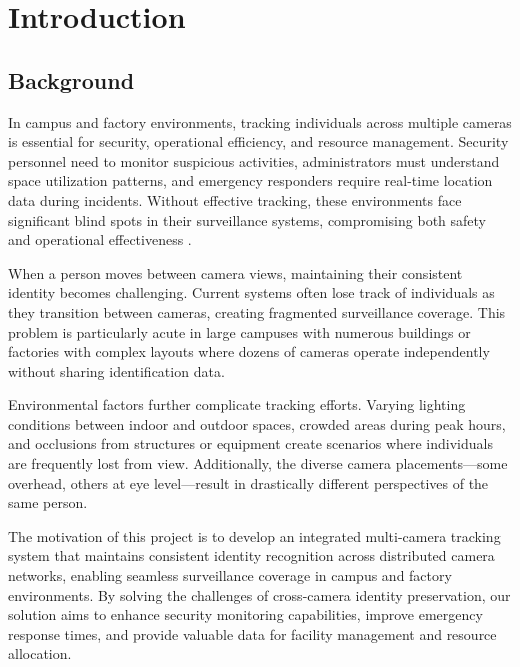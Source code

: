 \newcommand{\persona}[4]{%
    \textbf{#1}
    \small\begin{tabular}[t]{|p{.8in} | p{1.5in}|}
        \hline
        \textbf{Preferences} & #2 \\\hline
        \textbf{Pain Points} & #3 \\\hline
        \textbf{Goals} & #4 \\
        \hline
    \end{tabular}
    \vspace{4pt}
}


\chapter{Introduction}
\label{chap:introduction}

\section{Background}
\label{section:background}

In campus and factory environments, tracking individuals across multiple cameras is essential for security, operational efficiency, and resource management. Security personnel need to monitor suspicious activities, administrators must understand space utilization patterns, and emergency responders require real-time location data during incidents. Without effective tracking, these environments face significant blind spots in their surveillance systems, compromising both safety and operational effectiveness \cite{wangetal:2021}.

When a person moves between camera views, maintaining their consistent identity becomes challenging. Current systems often lose track of individuals as they transition between cameras, creating fragmented surveillance coverage. This problem is particularly acute in large campuses with numerous buildings or factories with complex layouts where dozens of cameras operate independently without sharing identification data.

Environmental factors further complicate tracking efforts. Varying lighting conditions between indoor and outdoor spaces, crowded areas during peak hours, and occlusions from structures or equipment create scenarios where individuals are frequently lost from view. Additionally, the diverse camera placements—some overhead, others at eye level—result in drastically different perspectives of the same person.

The motivation of this project is to develop an integrated multi-camera tracking system that maintains consistent identity recognition across distributed camera networks, enabling seamless surveillance coverage in campus and factory environments. By solving the challenges of cross-camera identity preservation, our solution aims to enhance security monitoring capabilities, improve emergency response times, and provide valuable data for facility management and resource allocation.
